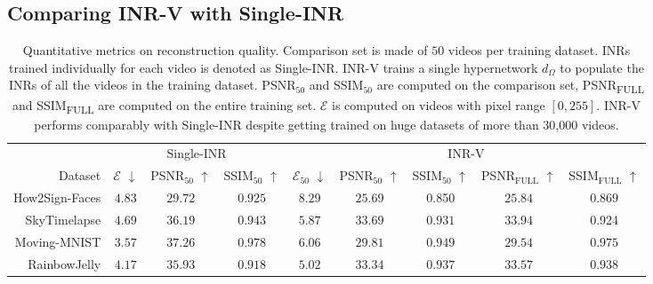 \documentclass[10pt]{article} \usepackage[accepted]{tmlr}
\begin{document}
\subsection{Comparing INR-V with Single-INR}
\begin{table}
\begin{adjustbox}{max width=\textwidth}
\begin{tabular}{r|ccc|ccc|cc}
   \toprule
   & \multicolumn{3}{c|}{Single-INR} & \multicolumn{5}{c}{INR-V} \\
   Dataset &  $\mathcal{E}$ $\downarrow$ & PSNR$_{50}$ $\uparrow$ & SSIM$_{50}$ $\uparrow$ &  $\mathcal{E}_{50}$ $\downarrow$ & PSNR$_{50}$ $\uparrow$ & SSIM$_{50}$ $\uparrow$ & PSNR$_{\textrm{FULL}}$ $\uparrow$ & SSIM$_{\textrm{FULL}}$ $\uparrow$ \\
   \midrule
   How2Sign-Faces & $4.83$ & $29.72$ & $0.925$ & $8.29$ & $25.69$ & 0.850 & $25.84$ & $0.869$ \\ 
   SkyTimelapse & $4.69$ & $36.19$ & $0.943$ & $5.87$ & $33.69$ & $0.931$ & $33.94$ & 0.924 \\
   Moving-MNIST & $3.57$ & $37.26$ & $0.978$ & $6.06$ & $29.81$ & $0.949$ & $29.54$ & $0.975$ \\
   RainbowJelly & $4.17$ & $35.93$ & $0.918$ & $5.02$ & $33.34$ & $0.937$ & $33.57$ & $0.938$\\
   \bottomrule
\end{tabular}\end{adjustbox}
  \caption{\small Quantitative metrics on reconstruction quality. Comparison set is made of $50$ videos per training dataset. INRs trained individually for each video is denoted as Single-INR. INR-V trains a single hypernetwork $d_\Omega$ to populate the INRs of all the videos in the training dataset. PSNR$_{50}$ and SSIM$_{50}$ are computed on the comparison set, PSNR\textsubscript{FULL} and SSIM\textsubscript{FULL} are computed on the entire training set. $\mathcal{E}$ is computed on videos with pixel range $[0, 255]$. INR-V performs comparably with Single-INR despite getting trained on huge datasets of more than $30$,$000$ videos.}
  \label{tab:inrvsinrv}
\end{table}
\end{document}
